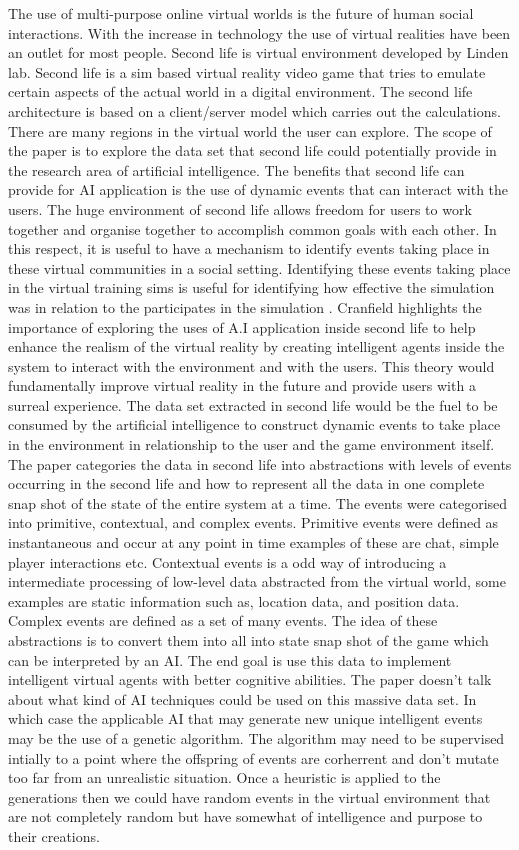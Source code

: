 \documentclass[12pt]{article} %
\begin{document}
The use of multi-purpose online virtual worlds is the future of human social interactions. With the increase in technology the use of virtual realities have been an outlet for most people. Second life is virtual environment developed by Linden lab. Second life is a sim based virtual reality video game that tries to emulate certain aspects of the actual world in a digital environment. The second life architecture is based on a client/server model which carries out the calculations. There are many regions in the virtual world the user can explore. The scope of the paper is to explore the data set that second life could potentially provide in the research area of artificial intelligence. The benefits that second life can provide for AI application is the use of dynamic events that can interact with the users. The huge environment of second life allows freedom for users to work together and organise together to accomplish common goals with each other. In this respect, it is useful to have a mechanism to identify events taking place in these virtual communities in a social setting. Identifying these events taking place in the virtual training sims is useful for identifying how effective the simulation was in relation to the participates in the simulation \cite{Cranfield}. Cranfield highlights the importance of exploring the uses of A.I application inside second life to help enhance the realism of the virtual reality by creating intelligent agents inside the system to interact with the environment and with the users. This theory would fundamentally improve virtual reality in the future and provide users with a surreal experience. The data set extracted in second life would be the fuel to be consumed by the artificial intelligence to construct dynamic events to take place in the environment in relationship to the user and the game environment itself. The paper categories the data in second life into abstractions with levels of events occurring in the second life and how to represent all the data in one complete snap shot of the state of the entire system at a time. The events were categorised into primitive, contextual, and complex events. Primitive events were defined as instantaneous and occur at any point in time examples of these are chat, simple player interactions etc. Contextual events is a odd way of introducing a intermediate processing of low-level data abstracted from the virtual world, some examples are static information such as, location data, and position data. Complex events are defined as a set of many events. The idea of these abstractions is to convert them into all into state snap shot of the game which can be interpreted by an AI. The end goal is use this data to implement intelligent virtual agents  with better cognitive abilities. The paper doesn't talk about what kind of AI techniques could be used on this massive data set. In which case the applicable AI that may generate new unique intelligent events may be the use of a genetic algorithm. The algorithm may need to be supervised intially to a point where the offspring of events are corherrent and don't mutate too far from an unrealistic situation. Once a heuristic is applied to the generations then we could have random events in the virtual environment that are not completely random but have somewhat of intelligence and purpose to their creations.
\end{document}
